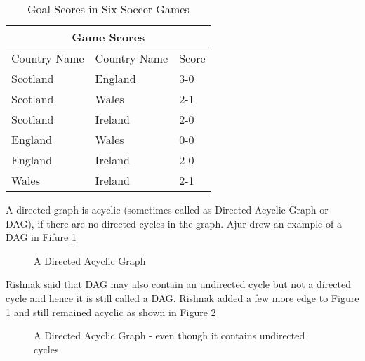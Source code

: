 \begin{table}
\begin{center}
\begin{tabular}{ |p{3cm}||p{3cm}||p{1.5cm} || }
 \hline
 \multicolumn{3}{|c|}{Game Scores} \\
 \hline
 Country Name & Country Name &Score\\
 \hline
 Scotland  & England    &3-0\\
 Scotland& Wales&2-1\\
 Scotland&Ireland&2-0\\
 England&Wales&0-0\\
 England&Ireland &2-0\\
 Wales&Ireland&2-1\\
 
 
 \hline
\end{tabular}
\caption{Goal Scores in Six Soccer Games}\label{14t3}
\end{center}
\end{table}
A directed graph is acyclic (sometimes called as Directed Acyclic Graph or DAG), if there are no directed cycles in the graph. Ajur drew an example of a DAG in Fifure \ref{15g5}

\begin{figure}
\begin{center}
\caption{ A Directed Acyclic Graph}\label{15g5}
\end{center}
\end{figure}

Rishnak said that DAG may also contain an undirected cycle but not a directed cycle and hence it is still called a DAG. Rishnak added a few more edge to Figure \ref{15g5} and still remained acyclic as shown in Figure \ref{15g6}

\begin{figure}
\begin{center}
\caption{ A Directed Acyclic Graph - even though it contains undirected cycles }\label{15g6}
\end{center}
\end{figure}

